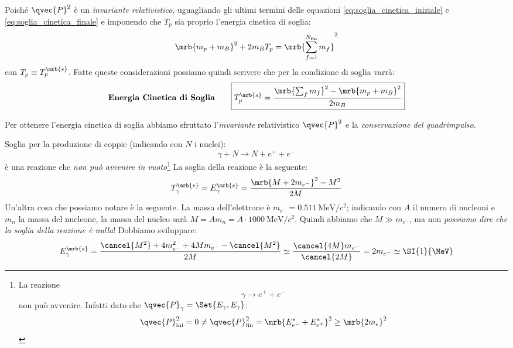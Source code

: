 Poiché $\qvec{P}^2$ è un \textit{invariante relativistico}, uguagliando gli
ultimi termini delle equazioni \ref{eq:soglia_cinetica_iniziale} e
\ref{eq:soglia_cinetica_finale} e imponendo che $T_p$ sia proprio l'energia
cinetica di soglia:
\begin{equation}
	\mrb{m_p + m_B}^2 + 2 m_B T_p = \mrb{\sum_{f=1}^{N_\text{fin}} m_f}^2
\end{equation}
con $T_p \equiv T_p^{\mrb{s}}$.
Fatte queste considerazioni possiamo quindi scrivere che per la condizione di
soglia varrà:
\begin{equation}
	\textbf{Energia Cinetica di Soglia}
	\qquad
	\boxed{T_p^{\mrb{s}} = \frac{\mrb{\sum_f m_f}^2 - \mrb{m_p + m_B}^2}{2 m_B}}
\end{equation}

\begin{note}[]
	Per ottenere l'energia cinetica di soglia abbiamo sfruttato
	l'\textit{invariante} relativistico $\qvec{P}^{2}$ e la \textit{conservazione
		del quadrimpulso}.
\end{note}

\begin{example}
	Soglia per la produzione di coppie (indicando con $N$ i nuclei):
	\begin{equation}
		\gamma + N \rightarrow N + e^+ + e^-
	\end{equation}
	è una reazione che \textit{non può avvenire in vuoto}\footnote{
		La reazione
		\[
			\gamma \rightarrow e^+ + e^-
		\]
		non può avvenire. Infatti dato che
		$\qvec{P}_{\gamma} = \Set{E _{\gamma}, E _{\gamma}}$:
		\[
			\qvec{P}^2_\text{ini} = 0 \neq \qvec{P}^2_\text{fin} = \mrb{E
					_{e^-}^{\ast} + E _{e^+}^{\ast}}^{2} \geq \mrb{2 m_e}^{2}
		\]
	}
	La soglia della reazione è la seguente:
	\begin{equation}
		T _{\gamma} ^{\mrb{s}} = E _{\gamma} ^{\mrb{s}} = \frac{\mrb{M + 2 m
					_{e^-}}^{2} - M^2}{2M}
	\end{equation}
	Un'altra cosa che possiamo notare è la seguente. La massa dell'elettrone è
	$m _{e^-} = \SI{0.511}{\MeV \per c^2}$; indicando con $A$ il numero di
	nucleoni e $m_n$ la massa del nucleone, la massa del nucleo sarà $M = A m_n =
		A \cdot \SI{1000}{\MeV \per c^2}$. Quindi abbiamo che $M \gg m _{e^-}$,
	ma non \textit{possiamo dire che la soglia della reazione è nulla}!
	Dobbiamo sviluppare:
	\begin{equation}
		E _{\gamma} ^{\mrb{s}} = \frac{\cancel{M^2} + 4 m _{e^-}^{2} + 4 M m _{e^-}
			- \cancel{M^2}}{2M} \simeq \frac{\cancel{4M}m _{e^-}}{\cancel{2M}} = 2 m
			_{e^-} \simeq \SI{1}{\MeV}
	\end{equation}
\end{example}

